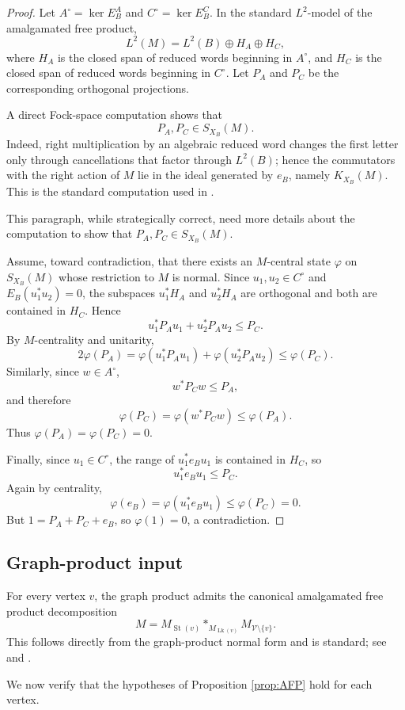 \documentclass[12pt]{article}
\theoremstyle{definition}
\newcommand{\V}{\mathcal V}
\newcommand{\Lk}{\operatorname{Lk}}
\newcommand{\St}{\operatorname{St}}
\newcommand{\freeprod}{\mathop{*}}
\newcommand{\review}[1]{\begin{reviewbox}#1\end{reviewbox}}
\begin{document}
\begin{proof}
Let $A^\circ=\ker E_B^A$ and $C^\circ=\ker E_B^C$.  In the standard $L^2$-model of the amalgamated free product,
\[
L^2(M)=L^2(B)\oplus H_A\oplus H_C,
\]
where $H_A$ is the closed span of reduced words beginning in $A^\circ$, and $H_C$ is the closed span of reduced words beginning in $C^\circ$.  Let $P_A$ and $P_C$ be the corresponding orthogonal projections.

A direct Fock-space computation shows that
\[
P_A,P_C\in S_{X_B}(M).
\]
Indeed, right multiplication by an algebraic reduced word changes the first letter only through cancellations that factor through $L^2(B)$; hence the commutators with the right action of $M$ lie in the ideal generated by $e_B$, namely $K_{X_B}(M)$.  This is the standard computation used in \cite[Section 6]{DKEP}.

\review{This paragraph, while strategically correct, need more details about the computation to show that $ P_A,P_C\in S_{X_B}(M) $.}

Assume, toward contradiction, that there exists an $M$-central state $\varphi$ on $S_{X_B}(M)$ whose restriction to $M$ is normal.  Since $u_1,u_2\in C^\circ$ and $E_B(u_1^*u_2)=0$, the subspaces $u_1^*H_A$ and $u_2^*H_A$ are orthogonal and both are contained in $H_C$.  Hence
\[
u_1^*P_Au_1+u_2^*P_Au_2\leq P_C.
\]
By $M$-centrality and unitarity,
\[
2\varphi(P_A)
=
\varphi(u_1^*P_Au_1)+\varphi(u_2^*P_Au_2)
\leq \varphi(P_C).
\]
Similarly, since $w\in A^\circ$,
\[
w^*P_Cw\leq P_A,
\]
and therefore
\[
\varphi(P_C)=\varphi(w^*P_Cw)\leq \varphi(P_A).
\]
Thus $\varphi(P_A)=\varphi(P_C)=0$.

Finally, since $u_1\in C^\circ$, the range of $u_1^*e_Bu_1$ is contained in $H_C$, so
\[
u_1^*e_Bu_1\leq P_C.
\]
Again by centrality,
\[
\varphi(e_B)=\varphi(u_1^*e_Bu_1)\leq \varphi(P_C)=0.
\]
But $1=P_A+P_C+e_B$, so $\varphi(1)=0$, a contradiction.
\end{proof}

\subsection{Graph-product input}

For every vertex $v$, the graph product admits the canonical amalgamated free product decomposition
\[
M
=
M_{\St(v)}
\freeprod_{M_{\Lk(v)}}
M_{\V\setminus\{v\}}.
\]
This follows directly from the graph-product normal form and is standard; see \cite{CF} and \cite[Section 1.1]{CDHJKEN}.

We now verify that the hypotheses of Proposition \ref{prop:AFP} hold for each vertex.
\end{document}
